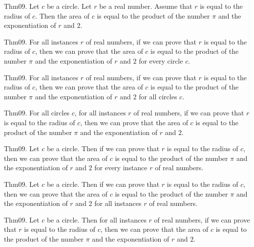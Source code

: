 \documentclass{article}
\begin{document}
Thm09. Let $c$ be a circle. Let $r$ be a real number. Assume that $r$ is equal to the radius of $c$. Then the area of $c$ is equal to the product of the number \(\pi\) and the exponentiation of $r$ and $2$.

Thm09. For all instances $r$ of real numbers, if we can prove that $r$ is equal to the radius of $c$, then we can prove that the area of $c$ is equal to the product of the number \(\pi\) and the exponentiation of $r$ and $2$ for every circle $c$.

Thm09. For all instances $r$ of real numbers, if we can prove that $r$ is equal to the radius of $c$, then we can prove that the area of $c$ is equal to the product of the number \(\pi\) and the exponentiation of $r$ and $2$ for all circles $c$.

Thm09. For all circles $c$, for all instances $r$ of real numbers, if we can prove that $r$ is equal to the radius of $c$, then we can prove that the area of $c$ is equal to the product of the number \(\pi\) and the exponentiation of $r$ and $2$.

Thm09. Let $c$ be a circle. Then if we can prove that $r$ is equal to the radius of $c$, then we can prove that the area of $c$ is equal to the product of the number \(\pi\) and the exponentiation of $r$ and $2$ for every instance $r$ of real numbers.

Thm09. Let $c$ be a circle. Then if we can prove that $r$ is equal to the radius of $c$, then we can prove that the area of $c$ is equal to the product of the number \(\pi\) and the exponentiation of $r$ and $2$ for all instances $r$ of real numbers.

Thm09. Let $c$ be a circle. Then for all instances $r$ of real numbers, if we can prove that $r$ is equal to the radius of $c$, then we can prove that the area of $c$ is equal to the product of the number \(\pi\) and the exponentiation of $r$ and $2$.
\end{document}
